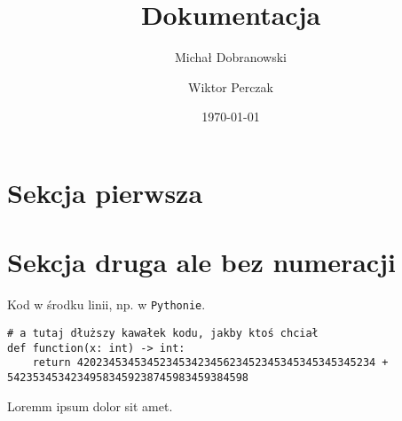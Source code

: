 \documentclass[11pt]{scrartcl}
\title{Dokumentacja}
\author{Michał Dobranowski \and Wiktor Perczak}
\date{\today}
\begin{document}
\maketitle

\section{Sekcja pierwsza}

\section*{Sekcja druga ale bez numeracji}

Kod w środku linii, np. w \texttt{Pythonie}.

\begin{verbatim}
# a tutaj dłuższy kawałek kodu, jakby ktoś chciał
def function(x: int) -> int:
    return 42023453453452345342345623452345345345345345234 + 54235345342349583459238745983459384598
\end{verbatim}

Loremm ipsum dolor sit amet.
\end{document}
